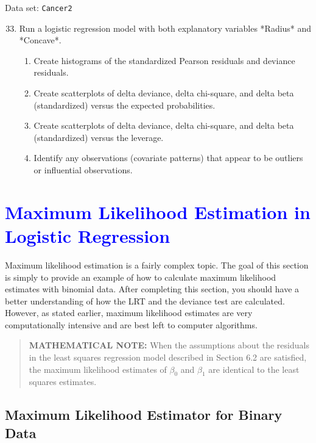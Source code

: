 \documentclass[
]{report}
\begin{document}
Data set: \texttt{Cancer2}

\begin{enumerate}
  \setcounter{enumi}{32}

  \item Run a logistic regression model with both explanatory variables *Radius* and *Concave*. 
  \begin{enumerate}
   \item Create histograms of the standardized Pearson residuals and deviance residuals.  
   \item Create scatterplots of delta deviance, delta chi-square, and delta beta (standardized) versus the expected probabilities.  
   \item Create scatterplots of delta deviance, delta chi-square, and delta beta (standardized) versus the leverage.  
   \item Identify any observations (covariate patterns) that appear to be outliers or influential observations.
\end{enumerate}
\end{enumerate}

\hypertarget{section-75}{%
\section{\texorpdfstring{\textcolor{blue}{ Maximum Likelihood Estimation in Logistic Regression}}{}}\label{section-75}}

Maximum likelihood estimation is a fairly complex topic. The goal of this section is simply to provide an example of how to calculate maximum likelihood estimates with binomial data. After completing this section, you should have a better understanding of how the LRT and the deviance test are calculated. However, as stated earlier, maximum likelihood estimates are very computationally intensive and are best left to computer algorithms.

\begin{quote}
\textbf{MATHEMATICAL NOTE:} When the assumptions about the residuals in the least squares regression model described in Section 6.2 are satisfied, the maximum likelihood estimates of \(\scriptstyle \beta_0\) and \(\scriptstyle \beta_1\) are identical to the least squares estimates.
\end{quote}

\hypertarget{maximum-likelihood-estimator-for-binary-data}{%
\subsection*{Maximum Likelihood Estimator for Binary Data}\label{maximum-likelihood-estimator-for-binary-data}}
\end{document}
